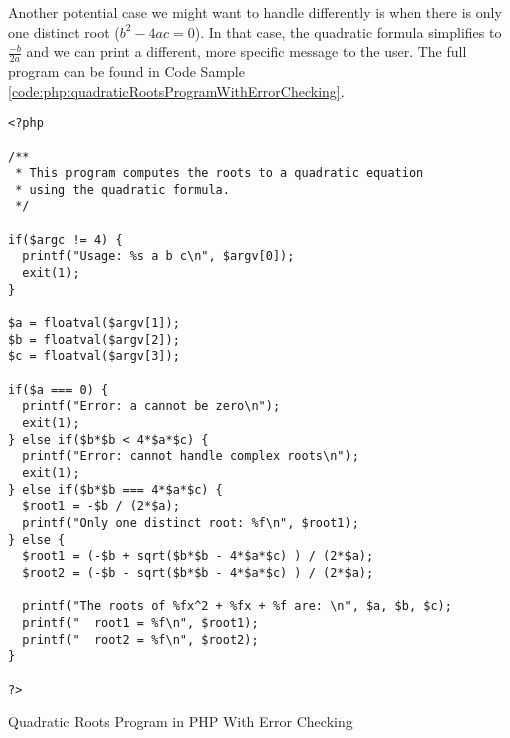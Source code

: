 Another potential case we might want to handle differently is when there is only
one distinct root ($b^2 - 4ac = 0$).  In that case, the quadratic formula simplifies 
to $\frac{-b}{2a}$ and we can print a different, more specific message to the user.
The full program can be found in Code Sample \ref{code:php:quadraticRootsProgramWithErrorChecking}.


\begin{listing}[h]
\begin{verbatim}
<?php

/**
 * This program computes the roots to a quadratic equation
 * using the quadratic formula.
 */

if($argc != 4) {
  printf("Usage: %s a b c\n", $argv[0]);
  exit(1);
}

$a = floatval($argv[1]);
$b = floatval($argv[2]);
$c = floatval($argv[3]);

if($a === 0) {
  printf("Error: a cannot be zero\n");
  exit(1);
} else if($b*$b < 4*$a*$c) {
  printf("Error: cannot handle complex roots\n");
  exit(1);
} else if($b*$b === 4*$a*$c) {
  $root1 = -$b / (2*$a);
  printf("Only one distinct root: %f\n", $root1);
} else {
  $root1 = (-$b + sqrt($b*$b - 4*$a*$c) ) / (2*$a);
  $root2 = (-$b - sqrt($b*$b - 4*$a*$c) ) / (2*$a);

  printf("The roots of %fx^2 + %fx + %f are: \n", $a, $b, $c);
  printf("  root1 = %f\n", $root1);
  printf("  root2 = %f\n", $root2);
}

?>
\end{verbatim}
\caption{Quadratic Roots Program in PHP With Error Checking}
\label{code:php:quadraticRootsProgramWithErrorChecking}
\end{listing}



